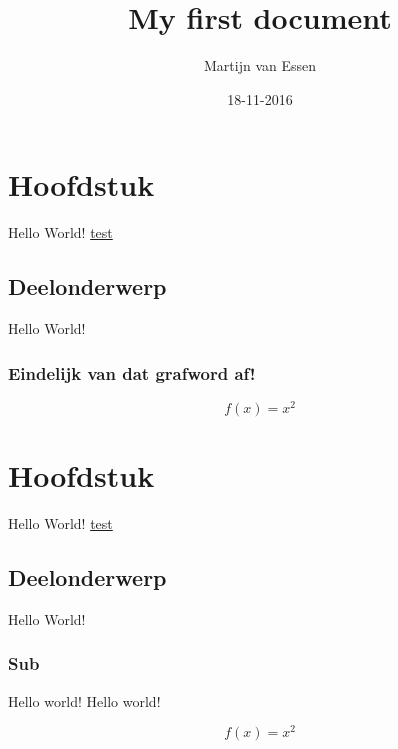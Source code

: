 \documentclass[numbers=endperiod]{scrartcl}
\title{My first document}
\date{18-11-2016}
\author{Martijn van Essen}
\begin{document}
	\maketitle
	\newpage
	
	\section{Hoofdstuk}
	Hello World!
	\underline{test}
	\subsection{Deelonderwerp}
	Hello World!
	\subsubsection{Eindelijk van dat grafword af!}
	\newpage
	
	\begin{equation}
		f(x) = x^2
	\end{equation}
	
	\section{Hoofdstuk}
	Hello World!
	\underline{test}
	\subsection{Deelonderwerp}
	Hello World!
	\subsubsection{Sub}
	Hello world!
	Hello world!
	
	\newpage
	
	\begin{equation}
	f(x) = x^2
	\end{equation}
	
\end{document}
